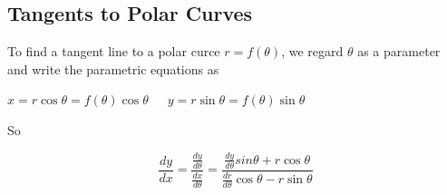   \subsection*{Tangents to Polar Curves}
    To find a tangent line to a polar curce $r=f(\theta)$, we regard $\theta$ as a parameter and write the parametric equations as
    \begin{center}
      $x=r\cos\theta = f(\theta)\cos\theta$\ \ \ $y=r\sin\theta=f(\theta)\sin\theta$
    \end{center}
    So
    \begin{definition}
      \begin{equation*}
        \frac{dy}{dx}=\frac{\frac{dy}{d\theta}}{\frac{dx}{d\theta}} = \frac{\frac{dy}{d\theta}sin\theta+r\cos\theta}{\frac{dr}{d\theta}\cos\theta-r\sin\theta}
      \end{equation*}
    \end{definition}

